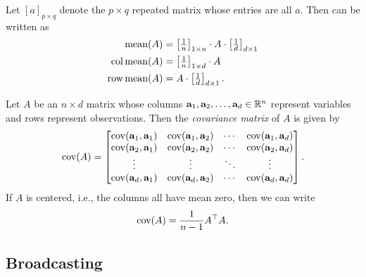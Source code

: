 \def\repmat#1#2{\textstyle\left[#1\right]_{#2}}
Let \([a]_{p \times q}\) denote the \(p \times q\) repeated matrix whose entries are all \(a\).
Then  can be written as
\begin{align}
    \mean(A) &= \repmat{\frac{1}{n}}{1 \times n} \cdot A \cdot \repmat{\frac{1}{d}}{d \times 1}\\
    \colmean(A) &= \repmat{\frac{1}{n}}{1 \times d} \cdot A \\
    \rowmean(A) &= A \cdot \repmat{\frac{1}{d}}{d \times 1}.
\end{align}

\begin{definition}
    \def\a{\mathbf{a}}
    Let \(A\) be an \(n \times d\) matrix whose columns \(\a_1, \a_2,\dots,\a_d \in \RR^n\) represent variables and rows represent observations.
    Then the \textit{covariance matrix} of \(A\) is given by
    \begin{equation}
        \label{eqn:covariance-matrix}
        \cov(A) = \begin{bmatrix}
            \cov(\a_1, \a_1) & \cov(\a_1, \a_2) & \cdots & \cov(\a_1, \a_d)\\
            \cov(\a_2, \a_1) & \cov(\a_2, \a_2) & \cdots & \cov(\a_2, \a_d)\\
            \vdots & \vdots & \ddots & \vdots\\
            \cov(\a_d, \a_1) & \cov(\a_d, \a_2) & \cdots & \cov(\a_d, \a_d)\\
        \end{bmatrix}.
    \end{equation}
    If \(A\) is centered, i.e., the columns all have mean zero, then we can write
    \begin{equation}
        \label{eqn:centered-covariance-matrix}
        \operatorname{cov}(A) = \frac{1}{n-1}A^\top A.
    \end{equation}
\end{definition}

\subsection{Broadcasting}
\label{subsec:broadcasting}

